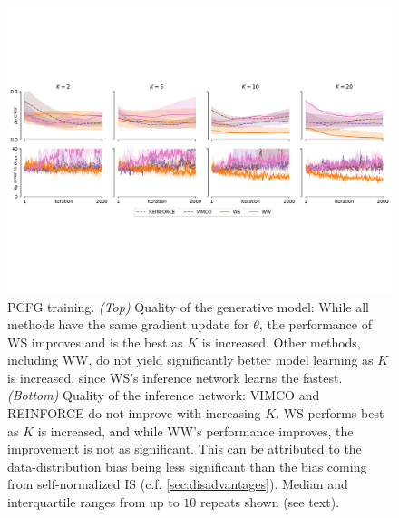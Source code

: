 \begin{figure}
  \centering
  \includegraphics[width=\textwidth]{figures/RRWS/pcfg/errors_vector.pdf}
  \vspace*{-0.7\baselineskip}
  \caption{
    \Gls{PCFG} training.
    \emph{(Top)}
    Quality of the generative model:
    While all methods have the same gradient update for $\theta$, the performance of \gls{WS} improves and is the best as $K$ is increased.
    Other methods, including \gls{WW}, do not yield significantly better model learning as $K$ is increased, since \gls{WS}'s inference network learns the fastest.
    \emph{(Bottom)}
    Quality of the inference network:
    \Gls{VIMCO} and \acrshort{REINFORCE} do not improve with increasing $K$.
    \Gls{WS} performs best as $K$ is increased, and while \gls{WW}'s performance improves, the improvement is not as significant.
    This can be attributed to the data-distribution bias being less significant than the bias coming from self-normalized \gls{IS} (c.f. \cref{sec:disadvantages}).
    Median and interquartile ranges from up to $10$ repeats shown (see text).
  }
  \label{fig:experiments/pcfg/astronomers_errors}
  \vspace*{-2ex}
\end{figure}


